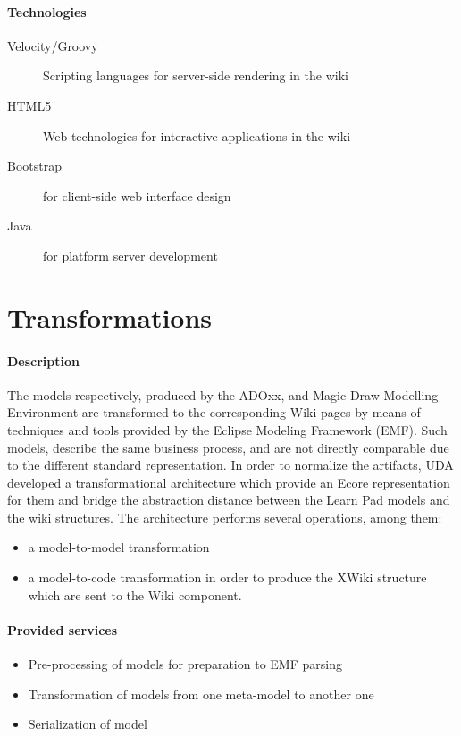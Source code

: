 \documentclass{learnpad}
\begin{document}
\paragraph{Technologies}
\begin{description}
	\item[Velocity/Groovy] Scripting languages for server-side rendering in the wiki
	\item[HTML5] Web technologies for interactive applications in the wiki
	\item[Bootstrap] for client-side web interface design
	\item[Java] for platform server development
\end{description}

\section{Transformations}\label{sec:transformations}
\paragraph{Description}
The models respectively, produced by the ADOxx, and Magic Draw Modelling
Environment are transformed to the corresponding Wiki pages by means of
techniques and tools provided by the Eclipse Modeling Framework (EMF). Such
models, describe the same business process, and are not directly comparable due
to the different standard representation. In order to normalize the artifacts,
UDA developed a transformational architecture which provide an Ecore
representation for them and bridge the abstraction distance between the Learn
Pad models and the wiki structures. The architecture performs several
operations, among them:
\begin{itemize}
	\item a model-to-model transformation
	\item a model-to-code transformation in order to produce the XWiki structure
		which are sent to the Wiki component.
\end{itemize}

\paragraph{Provided services}
\begin{itemize}
	\item Pre-processing of models for preparation to EMF parsing
	\item Transformation of models from one meta-model to another one
	\item Serialization of model
\end{itemize}
\end{document}
